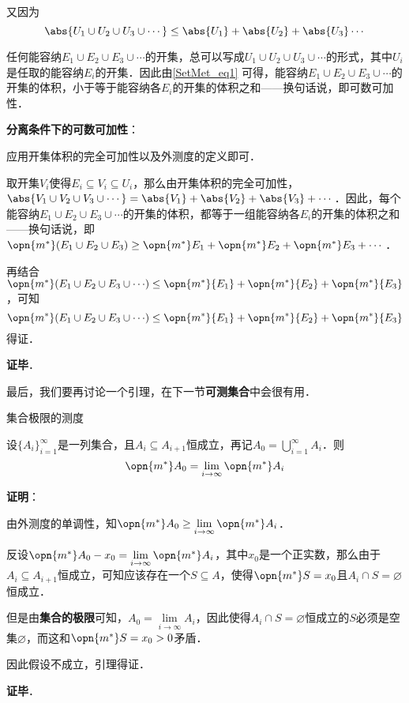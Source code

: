 又因为
\begin{equation}\label{SetMet_eq1}
\abs{U_1\cup U_2\cup U_3\cup \cdots} \leq \abs{U_1}+\abs{U_2}+\abs{U_3}\cdots
\end{equation}

任何能容纳$E_1\cup E_2\cup E_3\cup \cdots $的开集，总可以写成$U_1\cup U_2\cup U_3\cup \cdots$的形式，其中$U_i$是任取的能容纳$E_i$的开集．因此由\autoref{SetMet_eq1} 可得，能容纳$E_1\cup E_2\cup E_3\cup \cdots $的开集的体积，小于等于能容纳各$E_i$的开集的体积之和——换句话说，即可数可加性．

\textbf{分离条件下的可数可加性}：

应用开集体积的完全可加性以及外测度的定义即可．

取开集$V_i$使得$E_i\subseteq V_i\subseteq U_i$，那么由开集体积的完全可加性，$\abs{V_1\cup V_2\cup V_3\cup \cdots}=\abs{V_1}+\abs{V_2}+\abs{V_3}+\cdots$．因此，每个能容纳$E_1\cup E_2\cup E_3\cup\cdots$的开集的体积，都等于一组能容纳各$E_i$的开集的体积之和——换句话说，即$\opn{m^*}(E_1\cup E_2\cup E_3)\geq\opn{m^*}E_1+\opn{m^*}E_2+\opn{m^*}E_3+\cdots$．

再结合$\opn{m^*}({E_1\cup E_2\cup E_3\cup \cdots})\leq \opn{m^*}{E_1}+\opn{m^*}{E_2}+\opn{m^*}{E_3}$，可知
\begin{equation}
\opn{m^*}({E_1\cup E_2\cup E_3\cup \cdots})\leq \opn{m^*}{E_1}+\opn{m^*}{E_2}+\opn{m^*}{E_3}
\end{equation}
得证．

\textbf{证毕}．

最后，我们要再讨论一个引理，在下一节\textbf{可测集合}中会很有用．

\begin{lemma}{集合极限的测度}\label{SetMet_lem1}

设$\{A_i\}_{i=1}^\infty$是一列集合，且$A_{i}\subseteq A_{i+1}$恒成立，再记$A_0=\bigcup_{i=1}^\infty A_i$．则
\begin{equation}
\opn{m^*}A_0=\lim\limits_{i\to\infty}\opn{m^*}A_i
\end{equation}

\textbf{证明}：

由外测度的单调性，知$\opn{m^*}A_0\geq\lim\limits_{i\to\infty}\opn{m^*}A_i$．

反设$\opn{m^*}A_0-x_0=\lim\limits_{i\to\infty}\opn{m^*}A_i$，其中$x_0$是一个正实数，那么由于$A_{i}\subseteq A_{i+1}$恒成立，可知应该存在一个$S\subseteq A$，使得$\opn{m^*}S=x_0$且$A_i\cap S=\varnothing$恒成立．

但是由\textbf{集合的极限}可知，$A_0=\lim\limits_{i\to\infty} A_i$，因此使得$A_i\cap S=\varnothing$恒成立的$S$必须是空集$\varnothing$，而这和$\opn{m^*}S=x_0>0$矛盾．

因此假设不成立，引理得证．

\textbf{证毕}．




\end{lemma}

